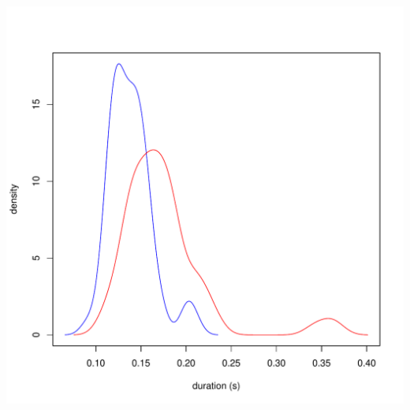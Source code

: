 \documentclass[a4paper,11pt]{article}\usepackage[]{graphicx}\usepackage[]{color}
\makeatletter
\def\maxwidth{ %
  \ifdim\Gin@nat@width>\linewidth
    \linewidth
  \else
    \Gin@nat@width
  \fi
}
\newenvironment{knitrout}{}{} %
\makeatother
\begin{document}
\begin{knitrout}
{\centering \includegraphics[width=\maxwidth]{img/bi-nas-dens-1} 

}



\end{knitrout}
\end{document}
